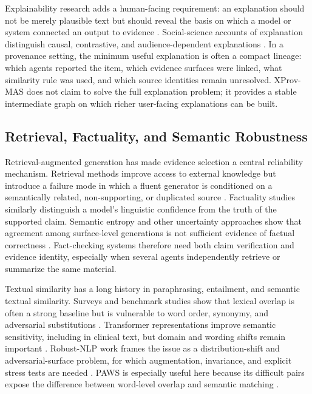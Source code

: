 \documentclass{ieeeaccess}
\begin{document}
Explainability research adds a human-facing requirement: an explanation should not be merely plausible text but should reveal the basis on which a model or system connected an output to evidence \cite{Anone1453561048,Anones201912012,Anona0203027314}. Social-science accounts of explanation distinguish causal, contrastive, and audience-dependent explanations \cite{Anonet201807007}. In a provenance setting, the minimum useful explanation is often a compact lineage: which agents reported the item, which evidence surfaces were linked, what similarity rule was used, and which source identities remain unresolved. XProv-MAS does not claim to solve the full explanation problem; it provides a stable intermediate graph on which richer user-facing explanations can be built.

\subsection{Retrieval, Factuality, and Semantic Robustness}
Retrieval-augmented generation has made evidence selection a central reliability mechanism. Retrieval methods improve access to external knowledge but introduce a failure mode in which a fluent generator is conditioned on a semantically related, non-supporting, or duplicated source \cite{Anonitacla00605,Anonr9025009453,Anonr0223228964}. Factuality studies similarly distinguish a model's linguistic confidence from the truth of the supported claim. Semantic entropy and other uncertainty approaches show that agreement among surface-level generations is not sufficient evidence of factual correctness \cite{Anond6024074210}. Fact-checking systems therefore need both claim verification and evidence identity, especially when several agents independently retrieve or summarize the same material.

Textual similarity has a long history in paraphrasing, entailment, and semantic textual similarity. Surveys and benchmark studies show that lexical overlap is often a strong baseline but is vulnerable to word order, synonymy, and adversarial substitutions \cite{Anona13jair2985,Anonscolia00237,Anonr7901593192}. Transformer representations improve semantic sensitivity, including in clinical text, but domain and wording shifts remain important \cite{Anonm0219619735,Anonr7901593192}. Robust-NLP work frames the issue as a distribution-shift and adversarial-surface problem, for which augmentation, invariance, and explicit stress tests are needed \cite{Anona1453593042,Anonr0223197769,Anondn202203001}. PAWS is especially useful here because its difficult pairs expose the difference between word-level overlap and semantic matching \cite{zhang2019paws}.
\end{document}
